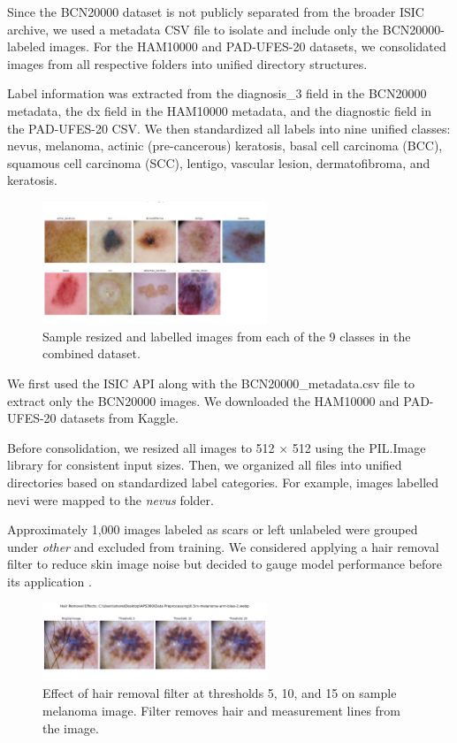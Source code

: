 \documentclass{article} %
\begin{document}
Since the BCN20000 dataset is not publicly separated from the broader ISIC archive, we used a metadata CSV file to isolate and include only the BCN20000-labeled images. For the HAM10000 and PAD-UFES-20 datasets, we consolidated images from all respective folders into unified directory structures.

Label information was extracted from the diagnosis\_3 field in the BCN20000 metadata, the dx field in the HAM10000 metadata, and the diagnostic field in the PAD-UFES-20 CSV. We then standardized all labels into nine unified classes: nevus, melanoma, actinic (pre-cancerous) keratosis, basal cell carcinoma (BCC), squamous cell carcinoma (SCC), lentigo, vascular lesion, dermatofibroma, and keratosis.

\begin{figure}[h]
\begin{center}
\includegraphics[width=0.6\textwidth]{Figs/sample_class_images.png}
\end{center}
\caption{Sample resized and labelled images from each of the 9 classes in the combined dataset.}
\end{figure}

We first used the ISIC API along with the BCN20000\_metadata.csv file to extract only the BCN20000 images. We downloaded the HAM10000 and PAD-UFES-20 datasets from Kaggle.

Before consolidation, we resized all images to 512 × 512 using the PIL.Image library for consistent input sizes. Then, we organized all files into unified directories based on standardized label categories. For example, images labelled nevi were mapped to the \textit{nevus} folder.

Approximately 1,000 images labeled as scars or left unlabeled were grouped under \textit{other} and excluded from training. We considered applying a hair removal filter to reduce skin image noise but decided to gauge model performance before its application \citep{kalpana2025enhancing}.

\begin{figure}[h]
\begin{center}
\includegraphics[width=0.6\textwidth]{Figs/hair_removal_filter.png}
\end{center}
\caption{Effect of hair removal filter at thresholds 5, 10, and 15 on sample melanoma image. Filter removes hair and measurement lines from the image.}
\end{figure}
\end{document}
